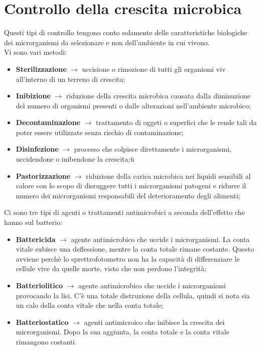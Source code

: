 \chapter{Controllo della crescita microbica}
Questi tipi di controllo tengono conto solamente delle caratteristiche biologiche dei microrganismi da selezionare e non dell'ambiente in cui vivono. \\Vi sono vari metodi:
\begin{itemize}
    \item \textbf{Sterilizzazione} $\xrightarrow{}$ uccisione o rimozione di tutti gli organismi viv all'interno di un terreno di crescita;
    \item \textbf{Inibizione} $\xrightarrow{}$ riduzione della crescita microbica causata dalla diminuzione del numero di organismi presenti o dalle alterazioni nell'ambiente microbico; 
    \item \textbf{Decontaminazione} $\xrightarrow{}$ trattamento di oggeti o superfici che le rende tali da poter essere utilizzate senza rischio di contaminazione; 
    \item \textbf{Disinfezione} $\xrightarrow{}$ processo che colpisce direttamente i microrganismi, uccidendone o inibendone la crescita;ù
    \item \textbf{Pastorizzazione} $\xrightarrow{}$ riduzione della carica microbica nei liquidi sensibili al calore con lo scopo di disruggere tutti i microrganismi patogeni e ridurre il numero dei microrganismi responsabili del deterioramento degli alimenti; 
\end{itemize}
Ci sono tre tipi di agenti o trattamenti antimicrobici a seconda dell'effetto che hanno sul batterio:
\begin{itemize}
    \item \textbf{Battericida} $\xrightarrow{}$ agente antimicrobico che uccide i microrganismi. La conta vitale subisce una deflessione, mentre la conta totale rimane costante. Questo avviene perchè lo sprettrofotometro non ha la capacità di differenziare le cellule vive da quelle morte, visto che non perdono l'integrità;
    \item \textbf{Batteriolitico} $\xrightarrow{}$ agente antimicrobico che uccide i microrganismi provocando la lisi. C'è una totale distruzione della cellula, quindi si nota sia un calo della conta vitale che nella conta totale;
    \item \textbf{Batteriostatico} $\xrightarrow{}$ agenti antimicroico che inibisce la crescita dei microrganismi. Dopo la sua aggiunta, la conta totale e la conta vitale rimangono costanti.
\end{itemize}
